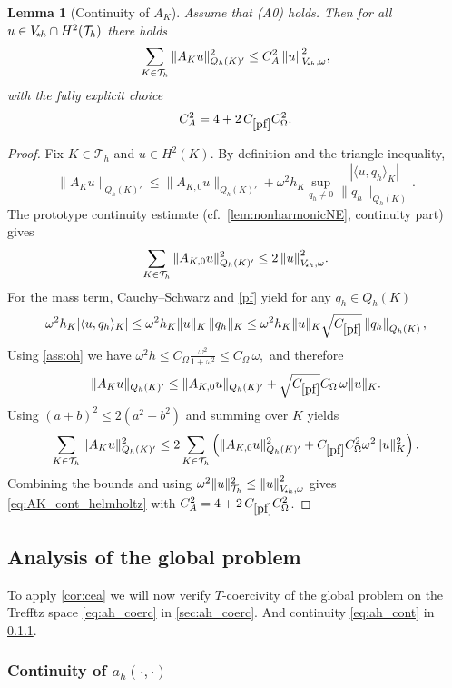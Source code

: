 \documentclass[11pt]{article}
\theoremstyle{definition}
\theoremstyle{plain}
\newtheorem{lemma}[theorem]{Lemma}
\newcommand{\CA}{C_A}
\newcommand{\const}[1]{C_{\eqref{#1}}}
\newcommand{\Vsh}{V_{\!\star \hspace*{-0.2mm}h}}
\newcommand{\tdgonorm}[1]{{\Vert#1\Vert}_{\Vsh,\omega}}
\newcommand{\Th}{{\calT_h}}
\newcommand{\AK}{{A_K}}
\newcommand{\QKh}{Q_h(K)}
\newcommand*{\norm}[1]{\left\|#1\right\|}
\newcommand{\calT}{\mathcal{T}}
\begin{document}
\begin{lemma}[Continuity of $\AK$]\label{lem:AK_cont}
Assume that (A0) holds.
Then for all $u\in \Vsh\cap H^2(\Th)$ there holds
\begin{equation}\label{eq:AK_cont_helmholtz}
\sum_{K\in\Th}\|\AK u\|_{\QKh'}^2 \le \CA^2\,\tdgonorm{u}^2,
\end{equation}
with the fully explicit choice
\[
\CA^2 = 4 + 2\,\const{pf}C_\Omega^2.
\]
\end{lemma}
\begin{proof}
Fix $K\in\Th$ and $u\in H^2(K)$. By definition and the triangle inequality,
\[
\|\AK u\|_{\QKh'}
\le \|A_{K,0}u\|_{\QKh'} + \omega^2 h_K \sup_{q_h\neq 0}\frac{|\langle u,q_h\rangle_K|}{\|q_h\|_{\QKh}}.
\]
The prototype continuity estimate (cf.\ \cref{lem:nonharmonicNE}, continuity part) gives
\[
\sum_{K\in\Th}\|A_{K,0}u\|_{\QKh'}^2 \le 2\,\tdgonorm{u}^2.
\]
For the mass term, Cauchy--Schwarz and \eqref{pf} yield for any $q_h\in\QKh$
\[
\omega^2 h_K|\langle u,q_h\rangle_K| \le \omega^2 h_K\|u\|_{K}\,\|q_h\|_{K}
\le 
\omega^2 h_K\|u\|_{K}\sqrt{\const{pf}}\norm{q_h}_{\QKh},
\]
Using \eqref{ass:oh} we have $\omega^2 h \le C_\Omega\frac{\omega^2}{1+\omega^2}\le C_\Omega\,\omega, $ and therefore
\[
\|\AK u\|_{\QKh'}
\le \|A_{K,0}u\|_{\QKh'} + \sqrt{\const{pf}}C_\Omega\,\omega \|u\|_{K}.
\]
Using $(a+b)^2\le 2(a^2+b^2)$ and summing over $K$ yields
\[
\sum_{K\in\Th}\|\AK u\|_{\QKh'}^2
\le 2\sum_{K\in\Th}\left(\|A_{K,0}u\|_{\QKh'}^2
+ \const{pf}C_\Omega^2\omega^2 \|u\|_{K}^2\right).
\]
Combining the bounds and using $\omega^2\|u\|_{\Th}^2\le \tdgonorm{u}^2$ gives \eqref{eq:AK_cont_helmholtz} with
$\CA^2 = 4 + 2\,\const{pf}C_\Omega^2$.
\end{proof}




\subsection{Analysis of the global problem}\label{sec:global_analysis}
To apply \cref{cor:cea} we will now verify $T$-coercivity of the global problem on the Trefftz space \eqref{eq:ah_coerc} in \cref{sec:ah_coerc}.
And continuity \eqref{eq:ah_cont} in \cref{sec:ah_cont}.



\subsubsection{Continuity of \texorpdfstring{$a_h(\cdot,\cdot)$}{ah}}\label{sec:ah_cont}
\end{document}
